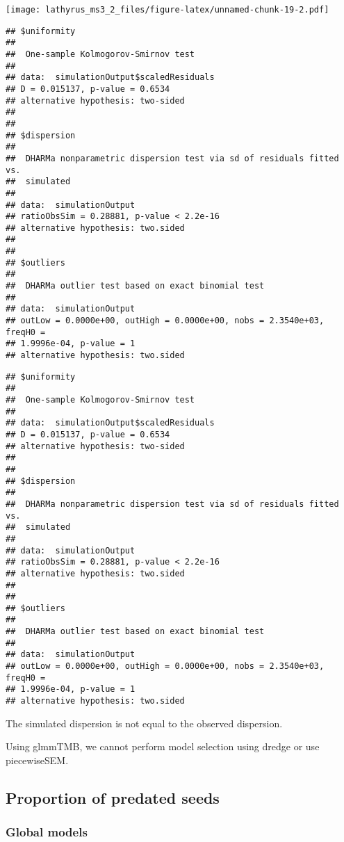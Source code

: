 \documentclass[
]{article}
\begin{document}
\texttt{[image: lathyrus\_ms3\_2\_files/figure-latex/unnamed-chunk-19-2.pdf]}

\begin{verbatim}
## $uniformity
## 
##  One-sample Kolmogorov-Smirnov test
## 
## data:  simulationOutput$scaledResiduals
## D = 0.015137, p-value = 0.6534
## alternative hypothesis: two-sided
## 
## 
## $dispersion
## 
##  DHARMa nonparametric dispersion test via sd of residuals fitted vs.
##  simulated
## 
## data:  simulationOutput
## ratioObsSim = 0.28881, p-value < 2.2e-16
## alternative hypothesis: two.sided
## 
## 
## $outliers
## 
##  DHARMa outlier test based on exact binomial test
## 
## data:  simulationOutput
## outLow = 0.0000e+00, outHigh = 0.0000e+00, nobs = 2.3540e+03, freqH0 =
## 1.9996e-04, p-value = 1
## alternative hypothesis: two.sided
\end{verbatim}

\begin{verbatim}
## $uniformity
## 
##  One-sample Kolmogorov-Smirnov test
## 
## data:  simulationOutput$scaledResiduals
## D = 0.015137, p-value = 0.6534
## alternative hypothesis: two-sided
## 
## 
## $dispersion
## 
##  DHARMa nonparametric dispersion test via sd of residuals fitted vs.
##  simulated
## 
## data:  simulationOutput
## ratioObsSim = 0.28881, p-value < 2.2e-16
## alternative hypothesis: two.sided
## 
## 
## $outliers
## 
##  DHARMa outlier test based on exact binomial test
## 
## data:  simulationOutput
## outLow = 0.0000e+00, outHigh = 0.0000e+00, nobs = 2.3540e+03, freqH0 =
## 1.9996e-04, p-value = 1
## alternative hypothesis: two.sided
\end{verbatim}

The simulated dispersion is not equal to the observed dispersion.

Using glmmTMB, we cannot perform model selection using dredge or use
piecewiseSEM.

\hypertarget{proportion-of-predated-seeds}{%
\subsection{Proportion of predated
seeds}\label{proportion-of-predated-seeds}}

\hypertarget{global-models-1}{%
\subsubsection{Global models}\label{global-models-1}}
\end{document}
